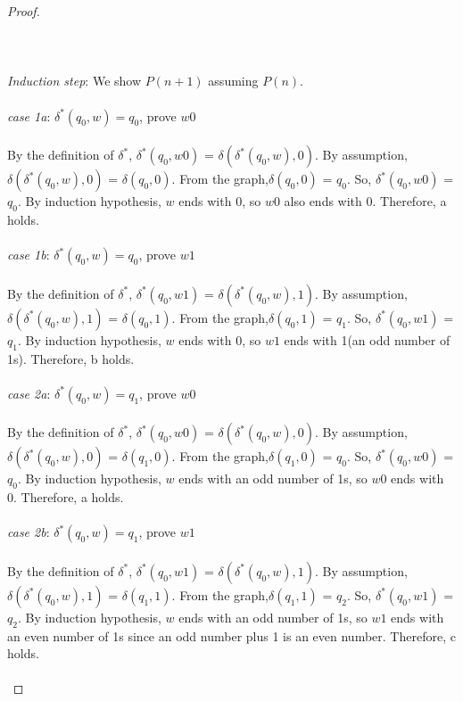 \documentclass[11pt,fleqn]{article}
\begin{document}
\begin{proof}
    \medskip
    \\\\
    \\\\
    \emph{Induction step}: We show $P(n + 1)$ assuming $P(n)$.
    \\\\
    \emph{case 1a}: $\delta^*(q_0,w) = q_0$, prove $w0$
    \\\\
    By the definition of $\delta^*$, $\delta^*(q_0,w0)$ = $\delta(\delta^*(q_0,w),0)$. By assumption, $\delta(\delta^*(q_0,w),0)$ = $\delta(q_0,0)$. 
    From the graph,$\delta(q_0,0)$ = $q_0$. So, $\delta^*(q_0,w0)$ = $q_0$.
    By induction hypothesis, $w$ ends with 0, so $w0$ also ends with 0. Therefore, a holds.
    \\\\
    \emph{case 1b}: $\delta^*(q_0,w) = q_0$, prove $w1$
    \\\\
    By the definition of $\delta^*$, $\delta^*(q_0,w1)$ = $\delta(\delta^*(q_0,w),1)$. By assumption, $\delta(\delta^*(q_0,w),1)$ = $\delta(q_0,1)$. 
    From the graph,$\delta(q_0,1)$ = $q_1$. So, $\delta^*(q_0,w1)$ = $q_1$.
    By induction hypothesis, $w$ ends with 0, so $w1$ ends with 1(an odd number of 1s). Therefore, b holds.
    \\\\
    \emph{case 2a}: $\delta^*(q_0,w) = q_1$, prove $w0$
    \\\\
    By the definition of $\delta^*$, $\delta^*(q_0,w0)$ = $\delta(\delta^*(q_0,w),0)$. By assumption, $\delta(\delta^*(q_0,w),0)$ = $\delta(q_1,0)$. 
    From the graph,$\delta(q_1,0)$ = $q_0$. So, $\delta^*(q_0,w0)$ = $q_0$.
    By induction hypothesis, $w$ ends with an odd number of 1s, so $w0$ ends with 0. Therefore, a holds.
    \\\\
    \emph{case 2b}: $\delta^*(q_0,w) = q_1$, prove $w1$
    \\\\
    By the definition of $\delta^*$, $\delta^*(q_0,w1)$ = $\delta(\delta^*(q_0,w),1)$. By assumption, $\delta(\delta^*(q_0,w),1)$ = $\delta(q_1,1)$. 
    From the graph,$\delta(q_1,1)$ = $q_2$. So, $\delta^*(q_0,w1)$ = $q_2$.
    By induction hypothesis, $w$ ends with an odd number of 1s, so $w1$ ends with an even number of 1s since an odd number plus 1 is an even number. Therefore, c holds.
    \\\\

\end{proof}
\end{document}
